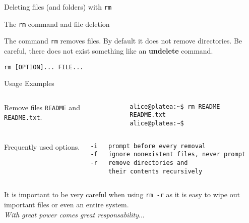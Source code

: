 \begin{frame}[t,fragile]{Deleting files (and folders) with \alert{\texttt{rm}}}

  \vspace{-0.3cm}
  \begin{block}{The  \texttt{rm} command  and file deletion}
    {\footnotesize
The command \texttt{rm} removes files. By default it does not remove
directories. Be careful, there does not exist something like an
\textbf{undelete} command.

\begin{lstlisting}
rm [OPTION]... FILE...
\end{lstlisting}
 

  Usage Examples
}


\vspace{-0.3cm}
{\scriptsize

  \begin{columns}
        Remove files \texttt{README} and
      \texttt{README.txt}.
        \begin{lstlisting}
alice@platea:~$ rm README README.txt
alice@platea:~$ 
        \end{lstlisting}
    \end{columns}
  \begin{columns}
        Frequently used options.
        \begin{lstlisting}
-i   prompt before every removal
-f   ignore nonexistent files, never prompt
-r   remove directories and 
     their contents recursively
        \end{lstlisting}
    \end{columns}
  }
  {\footnotesize
   It is important to be very
    careful when using \alert{\texttt{rm -r}} as it is easy to wipe out
    important files or even an entire system.\\ \emph{With great power comes
    great responsability}...}
  \end{block}
  
\end{frame}
